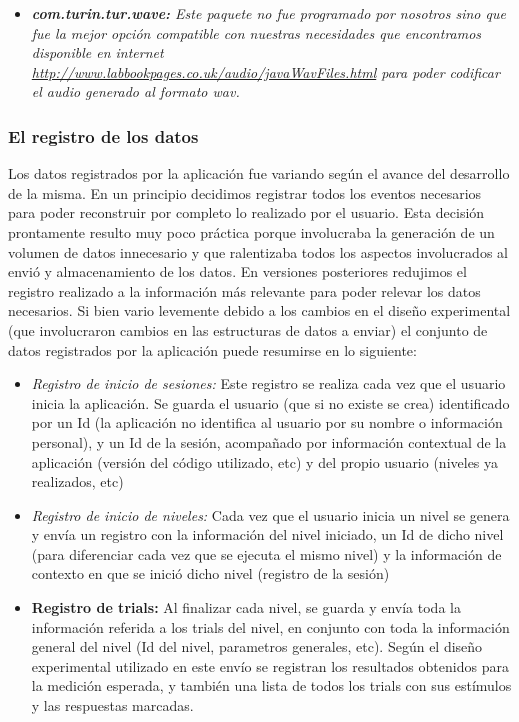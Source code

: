 \documentclass{article}
\begin{document}
\begin{itemize}
        \item \textit{\textbf{com.turin.tur.wave:} Este paquete no fue programado por nosotros sino que fue la mejor opción compatible con nuestras necesidades que encontramos disponible en internet \url{http://www.labbookpages.co.uk/audio/javaWavFiles.html} para poder codificar el audio generado al formato wav.}
        
    \end{itemize}
    
    \subsubsection{El registro de los datos}
    
    Los datos registrados por la aplicación fue variando según el avance del desarrollo de la misma. En un principio decidimos registrar todos los eventos necesarios para poder reconstruir por completo lo realizado por el usuario. Esta decisión prontamente resulto muy poco práctica porque involucraba la generación de un volumen de datos innecesario y que ralentizaba todos los aspectos involucrados al envió y almacenamiento de los datos. 
    En versiones posteriores redujimos el registro realizado a la información más relevante para poder relevar los datos necesarios. Si bien vario levemente debido a los cambios en el diseño experimental (que involucraron cambios en las estructuras de datos a enviar) el conjunto de datos registrados por la aplicación puede resumirse en lo siguiente:
    \begin{itemize}
        \item \textit{Registro de inicio de sesiones:} Este registro se realiza cada vez que el usuario inicia la aplicación. Se guarda el usuario (que si no existe se crea) identificado por un Id (la aplicación no identifica al usuario por su nombre o información personal), y un Id de la sesión, acompañado por información contextual de la aplicación (versión del código utilizado, etc) y del propio usuario (niveles ya realizados, etc)
        
        \item \textit{Registro de inicio de niveles:} Cada vez que el usuario inicia un nivel se genera y envía un registro con la información del nivel iniciado, un Id de dicho nivel (para diferenciar cada vez que se ejecuta el mismo nivel) y la información de contexto en que se inició dicho nivel (registro de la sesión)
        
        \item \textbf{Registro de trials:} Al finalizar cada nivel, se guarda y envía toda la información referida a los trials del nivel, en conjunto con toda la información general del nivel (Id del nivel, parametros generales, etc). Según el diseño experimental utilizado en este envío se registran los resultados obtenidos para la medición esperada, y también una lista de todos los trials con sus estímulos y las respuestas marcadas. 
    \end{itemize}
    
\end{document}
